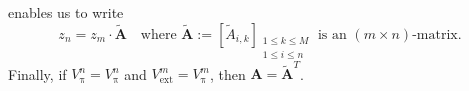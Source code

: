 \documentclass[a4paper]{paper}
\newcommand{\VecSpace}[1]{\mathscr{#1}}
\newcommand{\Field}{\mathbb{F}}
\newcommand{\Real}{\mathbb{R}}
\newcommand{\DiscOp}[1]{\mathsf{#1}}
\DeclareMathOperator{\rest}{\pi}
\newcommand{\vA}{\boldsymbol{A}}
\newcommand{\cF}{\mathcal{F}}
\newcommand{\ext}{\text{ext}}
\newcommand{\wt}[1]{\widetilde{#1}}
\begin{document}
enables us to write
\[ z_{n}=z_{m}\cdot\wt{\vA}
   \quad\text{where } 
   \wt{\vA}:=[ \wt{A}_{i,k} ]_{\substack{1\leq k \leq M \\ 
   1\leq i \leq n}}
   \text{ is an $(m\times n)$-matrix.} \]
Finally, if $V^n_{\rest}=V^n_{\rest}$ and 
$V^m_{\ext}=V^m_{\rest}$, then $\vA=\wt{\vA}^T$. 
%
%
%
%
%
%
\end{document}
